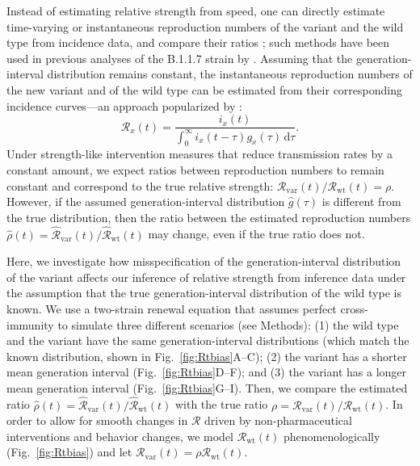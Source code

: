 \documentclass[12pt]{article}
\newcommand{\fref}[1]{Fig.~\ref{fig:#1}}
\newcommand{\vvvar}{\mathrm{var}}
\newcommand{\wwwt}{\mathrm{wt}}
\newcommand{\Rx}[1]{\ensuremath{{\mathcal R}_{#1}}\xspace}
\newcommand{\RR}{\ensuremath{{\mathcal R}}\xspace}
\newcommand{\Rw}{\Rx{\wwwt}}
\newcommand{\Rv}{\Rx{\vvvar}}
\newcommand{\dd}[1]{\ensuremath{\, \mathrm{d}#1}}
\newcommand{\dtau}{\dd{\tau}}
\begin{document}
Instead of estimating relative strength from speed, one can directly estimate time-varying or instantaneous reproduction numbers of the variant and the wild type from incidence data, and compare their ratios \citep{fraser2007estimating};
such methods have been used in previous analyses of the B.1.1.7 strain by \cite{volz2021transmission}.
Assuming that the generation-interval distribution remains constant, the instantaneous reproduction numbers of the new variant and of the wild type can be estimated from their corresponding incidence curves---an approach popularized by \cite{cori2013new}:
\begin{equation}
\RR_x(t) = \frac{i_x(t)}{\int_0^\infty i_x(t-\tau) g_x(\tau) \dtau}.
\end{equation}
Under strength-like intervention measures that reduce transmission rates by a constant amount, we expect ratios between reproduction numbers to remain constant and correspond to the true relative strength: $\Rv(t)/\Rw(t) = \rho$.
However, if the assumed generation-interval distribution $\hat{g}(\tau)$ is different from the true distribution, then the ratio between the estimated reproduction numbers $\hat{\rho}(t) = \hat{\RR}_{\textrm{var}}(t)/\hat{\RR}_{\textrm{wt}}(t)$ may change, even if the true ratio does not.

Here, we investigate how misspecification of the generation-interval distribution of the variant affects our inference of relative strength from inference data under the assumption that the true generation-interval distribution of the wild type is known.
We use a two-strain renewal equation that assumes perfect cross-immunity to simulate three different scenarios (see Methods):  
(1) the wild type and the variant have the same generation-interval distributions (which match the known distribution, shown in \fref{Rtbias}A--C);
(2) the variant has a shorter mean generation interval (\fref{Rtbias}D--F); and
(3) the variant has a longer mean generation interval (\fref{Rtbias}G--I).
Then, we compare the estimated ratio $\hat{\rho}(t) = \hat{\RR}_{\textrm{var}}(t)/\hat{\RR}_{\textrm{wt}}(t)$ with the true ratio $\rho = \Rv(t)/\Rw(t)$.
In order to allow for smooth changes in $\RR$ driven by non-pharmaceutical interventions and behavior changes, we model $\Rw(t)$ phenomenologically (\fref{Rtbias}) and let $\Rv(t) = \rho \Rw(t)$.
\end{document}
